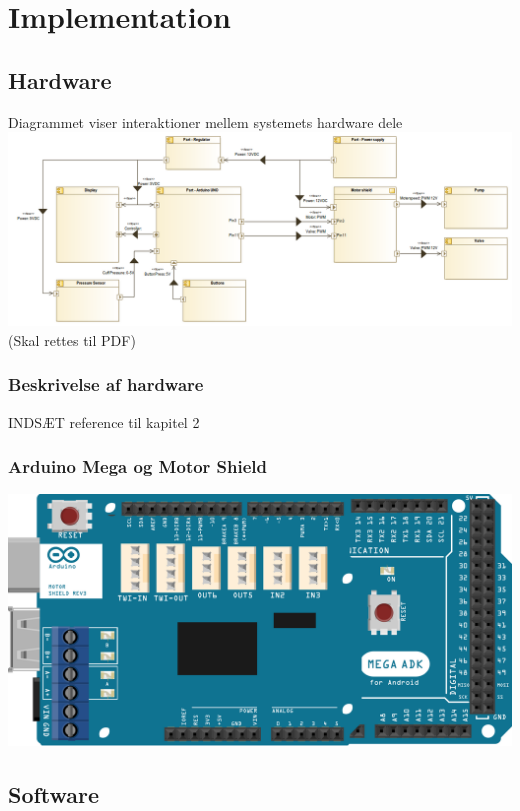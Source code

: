 \section{Implementation}

\subsection{Hardware}
Diagrammet viser interaktioner mellem systemets hardware dele \\
\includegraphics[width=\textwidth]{pdfs/InternalBlockdiagram(Hardware).png}
(Skal rettes til PDF)

\subsubsection{Beskrivelse af hardware}
INDSÆT reference til kapitel 2

\subsubsection{Arduino Mega og Motor Shield}
\includegraphics[width=\textwidth]{pdfs/MegaPlusShield-crop.pdf}

\subsection{Software}